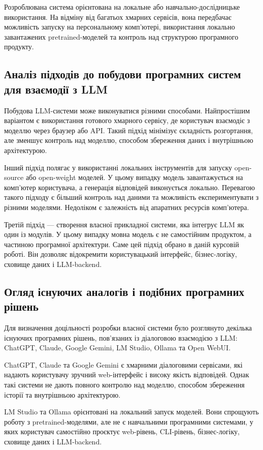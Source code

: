 Розроблювана система орієнтована на локальне або навчально-дослідницьке використання. На відміну від багатьох хмарних сервісів, вона передбачає можливість запуску на персональному комп'ютері, використання локально завантажених pretrained-моделей та контроль над структурою програмного продукту.

\subsection{Аналіз підходів до побудови програмних систем для взаємодії з LLM}

Побудова LLM-системи може виконуватися різними способами. Найпростішим варіантом є використання готового хмарного сервісу, де користувач взаємодіє з моделлю через браузер або API. Такий підхід мінімізує складність розгортання, але зменшує контроль над моделлю, способом збереження даних і внутрішньою архітектурою.

Інший підхід полягає у використанні локальних інструментів для запуску open-source або open-weight моделей. У цьому випадку модель завантажується на комп'ютер користувача, а генерація відповідей виконується локально. Перевагою такого підходу є більший контроль над даними та можливість експериментувати з різними моделями. Недоліком є залежність від апаратних ресурсів комп'ютера.

Третій підхід --- створення власної прикладної системи, яка інтегрує LLM як один із модулів. У цьому випадку мовна модель є не самостійним продуктом, а частиною програмної архітектури. Саме цей підхід обрано в даній курсовій роботі. Він дозволяє відокремити користувацький інтерфейс, бізнес-логіку, сховище даних і LLM-backend.

\subsection{Огляд існуючих аналогів і подібних програмних рішень}

Для визначення доцільності розробки власної системи було розглянуто декілька існуючих програмних рішень, пов'язаних із діалоговою взаємодією з LLM: ChatGPT, Claude, Google Gemini, LM Studio, Ollama та Open WebUI.

ChatGPT, Claude та Google Gemini є хмарними діалоговими сервісами, які надають користувачу зручний web-інтерфейс і високу якість відповідей. Однак такі системи не дають повного контролю над моделлю, способом збереження історії та внутрішньою архітектурою.

LM Studio та Ollama орієнтовані на локальний запуск моделей. Вони спрощують роботу з pretrained-моделями, але не є навчальними програмними системами, у яких користувач самостійно проєктує web-рівень, CLI-рівень, бізнес-логіку, сховище даних і LLM-backend.

